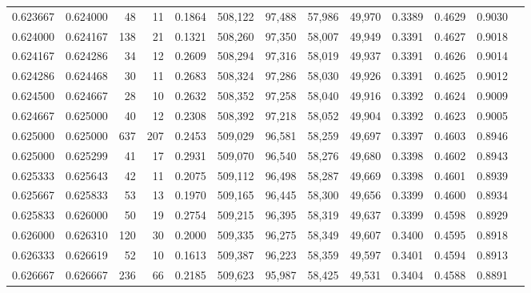 \begin{tabular}{rrrrrrrrrrrrr}
0.623667 & 0.624000 &    48 &  11 &                                     0.1864 & 508,122 &  97,488 &  57,986 &  49,970 & 0.3389 & 0.4629 & 0.9030 \\
0.624000 & 0.624167 &   138 &  21 &                                     0.1321 & 508,260 &  97,350 &  58,007 &  49,949 & 0.3391 & 0.4627 & 0.9018 \\
0.624167 & 0.624286 &    34 &  12 &                                     0.2609 & 508,294 &  97,316 &  58,019 &  49,937 & 0.3391 & 0.4626 & 0.9014 \\
0.624286 & 0.624468 &    30 &  11 &                                     0.2683 & 508,324 &  97,286 &  58,030 &  49,926 & 0.3391 & 0.4625 & 0.9012 \\
0.624500 & 0.624667 &    28 &  10 &                                     0.2632 & 508,352 &  97,258 &  58,040 &  49,916 & 0.3392 & 0.4624 & 0.9009 \\
0.624667 & 0.625000 &    40 &  12 &                                     0.2308 & 508,392 &  97,218 &  58,052 &  49,904 & 0.3392 & 0.4623 & 0.9005 \\
0.625000 & 0.625000 &   637 & 207 &                                     0.2453 & 509,029 &  96,581 &  58,259 &  49,697 & 0.3397 & 0.4603 & 0.8946 \\
0.625000 & 0.625299 &    41 &  17 &                                     0.2931 & 509,070 &  96,540 &  58,276 &  49,680 & 0.3398 & 0.4602 & 0.8943 \\
0.625333 & 0.625643 &    42 &  11 &                                     0.2075 & 509,112 &  96,498 &  58,287 &  49,669 & 0.3398 & 0.4601 & 0.8939 \\
0.625667 & 0.625833 &    53 &  13 &                                     0.1970 & 509,165 &  96,445 &  58,300 &  49,656 & 0.3399 & 0.4600 & 0.8934 \\
0.625833 & 0.626000 &    50 &  19 &                                     0.2754 & 509,215 &  96,395 &  58,319 &  49,637 & 0.3399 & 0.4598 & 0.8929 \\
0.626000 & 0.626310 &   120 &  30 &                                     0.2000 & 509,335 &  96,275 &  58,349 &  49,607 & 0.3400 & 0.4595 & 0.8918 \\
0.626333 & 0.626619 &    52 &  10 &                                     0.1613 & 509,387 &  96,223 &  58,359 &  49,597 & 0.3401 & 0.4594 & 0.8913 \\
0.626667 & 0.626667 &   236 &  66 &                                     0.2185 & 509,623 &  95,987 &  58,425 &  49,531 & 0.3404 & 0.4588 & 0.8891 \\

\end{tabular}
